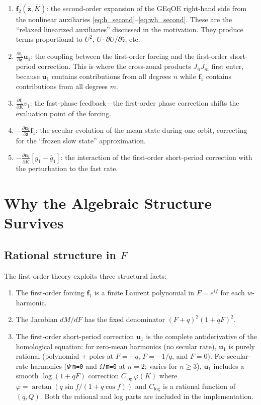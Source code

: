 \documentclass[11pt]{article}
\begin{document}
\begin{enumerate}
\item $\bm f_2(\bar{\bm z}, \bar K)$: the second-order expansion of the
GEqOE right-hand side from the nonlinear auxiliaries
\eqref{eq:h_second}--\eqref{eq:wh_second}. These are the ``relaxed
linearized auxiliaries'' discussed in the motivation. They produce terms
proportional to $U^2$, $U \cdot \partial U/\partial\hat z$, etc.

\item $\frac{\partial \bm f_1}{\partial \bm z} \bm u_1$: the coupling between
the first-order forcing and the first-order short-period correction. This
is where the cross-zonal products $J_n J_m$ first enter, because
$\bm u_1$ contains contributions from all degrees $n$ while
$\bm f_1$ contains contributions from all degrees $m$.

\item $\frac{\partial \bm f_1}{\partial K} v_1$: the fast-phase feedback---the
first-order phase correction shifts the evaluation point of the forcing.

\item $-\frac{\partial \bm u_1}{\partial \bar{\bm z}} \bar{\bm f}_1$: the
secular evolution of the mean state during one orbit, correcting for the
``frozen slow state'' approximation.

\item $-\frac{\partial \bm u_1}{\partial \bar K}
[g_1 - \bar g_1]$: the interaction of the first-order short-period
correction with the perturbation to the fast rate.
\end{enumerate}


\section{Why the Algebraic Structure Survives}

\subsection{Rational structure in $F$}

The first-order theory exploits three structural facts:
\begin{enumerate}
\item[(S1)] The first-order forcing $\bm f_1$ is a finite Laurent polynomial
in $F = e^{if}$ for each $w$-harmonic.
\item[(S2)] The Jacobian $dM/dF$ has the fixed denominator
$(F+q)^2(1+qF)^2$.
\item[(S3)] The first-order short-period correction $\bm u_1$ is the
complete antiderivative of the homological equation: for zero-mean
harmonics (no secular rate), $\bm u_1$ is purely rational
(polynomial + poles at $F = -q$, $F = -1/q$, and $F = 0$).  For
secular-rate harmonics ($\Psi$\,\texttt{m=0} and $\Omega$\,\texttt{m=0}
at $n=2$; varies for $n \ge 3$), $\bm u_1$ includes a smooth
$\log(1+qF)$ correction $C_{\log}\,\varphi(K)$ where
$\varphi = \arctan(q\sin f/(1+q\cos f))$ and $C_{\log}$ is a rational
function of $(q,Q)$.  Both the rational and log parts are included in
the implementation.
\end{enumerate}
\end{document}
